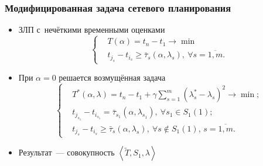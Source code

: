 \documentclass[12pt]{beamer}
\begin{document}

\begin{frame}
  \frametitle{Модифицированная задача сетевого планирования}
  \begin{itemize}
    \item ЗЛП с~нечёткими временными оценками
      \begin{equation}
      \label{eq:modified-fcpm-lp}
        \left\{ \begin{aligned}
          & T(\alpha )=t_n-t_1\to \min  \\ 
          & t_{j_s}-t_{i_s}\geqslant \bar{\tau}_s\left(\alpha,\lambda_s \right),\ \forall s=\overline{1,m}.
        \end{aligned} \right.
      \end{equation}
    \item При $\alpha = 0$ решается возмущённая задача
      \begin{equation}
      \label{eq:modified-fcpm-lp-alpha}
        \left \{ \begin{aligned}
          & T^* \left(\alpha, \lambda \right) = t_n-t_1+\gamma \sum \limits_{s=1}^{m} \left(\lambda_s^*-\lambda_s \right)^2 \to \min; \\
          & t_{j_{s_1}}-t_{i_{s_1}} = \bar{\tau}_{s_1}\left(\alpha, \lambda_{s_1} \right),\ \forall s_1 \in S_1\left(1\right); \\
          & t_{j_s}-t_{i_s} \geqslant \bar{\tau}_s\left(\alpha, \lambda_s \right),\ \forall s \notin S_1\left(1\right),\,s=\overline{1,m}.
        \end{aligned} \right.
      \end{equation}
    \item Результат~--- совокупность $\left \langle \tilde T, S_1, \lambda \right \rangle$
  \end{itemize}
\end{frame}

\end{document}
